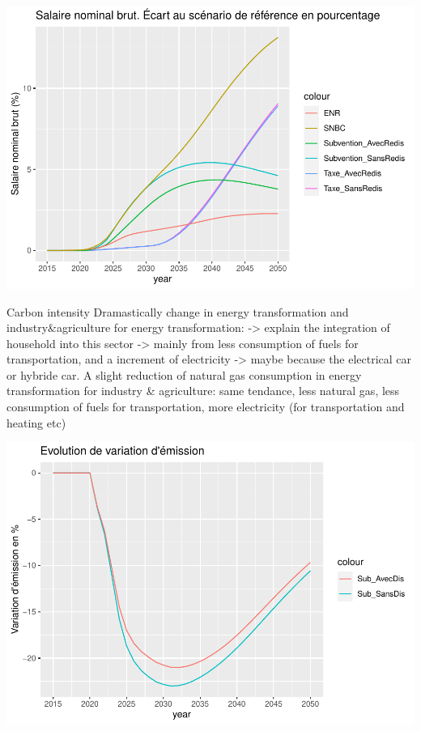 \documentclass[
]{article}
\begin{document}
\includegraphics{Modele-ThreeMe-Tunisie_Sequeira_Valilou_Wang_files/figure-latex/unnamed-chunk-13-1.pdf}

Carbon intensity Dramastically change in energy transformation and
industry\&agriculture for energy transformation: -\textgreater{} explain
the integration of household into this sector -\textgreater{} mainly
from less consumption of fuels for transportation, and a increment of
electricity -\textgreater{} maybe because the electrical car or hybride
car. A slight reduction of natural gas consumption in energy
transformation for industry \& agriculture: same tendance, less natural
gas, less consumption of fuels for transportation, more electricity (for
transportation and heating etc)

\includegraphics{Modele-ThreeMe-Tunisie_Sequeira_Valilou_Wang_files/figure-latex/unnamed-chunk-14-1.pdf}
\end{document}
